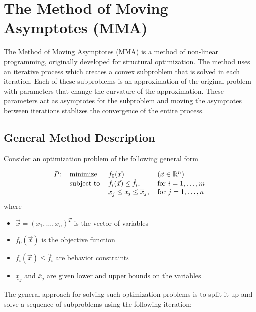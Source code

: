 \section{The Method of Moving Asymptotes (MMA)}

The Method of Moving Asymptotes (MMA) is a method of non-linear programming, originally developed for structural optimization. The method uses an iterative process which creates a convex subproblem that is solved in each iteration. Each of these subproblems is an approximation of the original problem with parameters that change the curvature of the approximation. These parameters act as asymptotes for the subproblem and moving the asymptotes between iterations stablizes the convergence of the entire process.

\subsection{General Method Description}
Consider an optimization problem of the following general form

\begin{equation}
	\begin{tabular}{llll}
		$P$: & minimize   & $f_0(\vec{x})$                                & $\left(\vec{x}\in\mathbb{R}^n\right)$ \\
		     & subject to & $f_i(\vec{x})\leq\hat{f}_i$,                  & for $i=1,\ldots,m$                    \\
		     &            & $\underline{x}_j\leq x_j\leq \overline{x}_j$, & for $j=1,\ldots,n$                    
	\end{tabular}
\end{equation}
where
\begin{itemize}
	\item $\vec{x}=\left(x_1,\ldots,x_n\right)^T$ is the vector of variables
	\item $f_0(\vec{x})$ is the objective function
	\item $f_i(\vec{x})\leq\hat{f}_i$ are behavior constraints
	\item $\underline{x}_j$ and $\overline{x}_j$ are given lower and upper bounds on the variables
\end{itemize}

The general approach for solving such optimization problems is to split it up and solve a sequence of subproblems using the following iteration:

